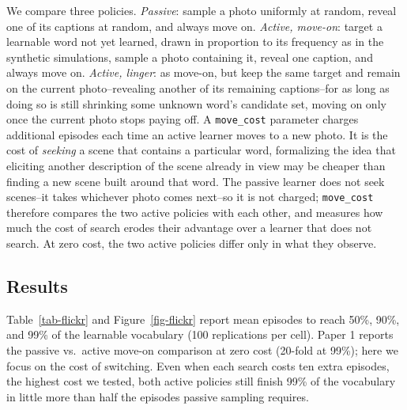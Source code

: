 \documentclass[a4paper,natbib,man]{apa6}
\begin{document}
We compare three policies. \textit{Passive}: sample a photo uniformly at random, reveal one of its captions at random, and always move on. \textit{Active, move-on}: target a learnable word not yet learned, drawn in proportion to its frequency as in the synthetic simulations, sample a photo containing it, reveal one caption, and always move on. \textit{Active, linger}: as move-on, but keep the same target and remain on the current photo--revealing another of its remaining captions--for as long as doing so is still shrinking some unknown word's candidate set, moving on only once the current photo stops paying off. A \texttt{move\_cost} parameter charges additional episodes each time an active learner moves to a new photo. It is the cost of \textit{seeking} a scene that contains a particular word, formalizing the idea that eliciting another description of the scene already in view may be cheaper than finding a new scene built around that word. The passive learner does not seek scenes--it takes whichever photo comes next--so it is not charged; \texttt{move\_cost} therefore compares the two active policies with each other, and measures how much the cost of search erodes their advantage over a learner that does not search. At zero cost, the two active policies differ only in what they observe.

\subsection{Results}
Table~\ref{tab-flickr} and Figure~\ref{fig-flickr} report mean episodes to reach 50\%, 90\%, and 99\% of the learnable vocabulary (100 replications per cell). Paper 1 reports the passive vs.\ active move-on comparison at zero cost (20-fold at 99\%); here we focus on the cost of switching. Even when each search costs ten extra episodes, the highest cost we tested, both active policies still finish 99\% of the vocabulary in little more than half the episodes passive sampling requires.
\end{document}
